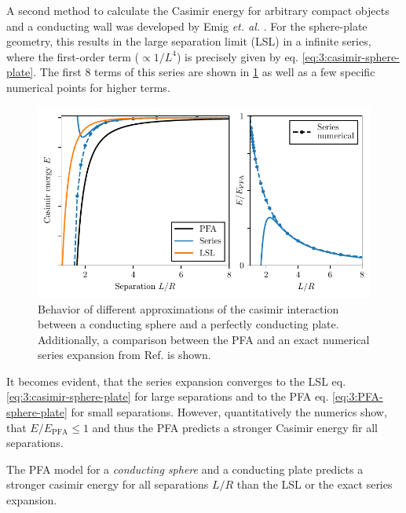 A second method to calculate the Casimir energy for arbitrary compact objects and a conducting wall was developed by Emig \textit{et. al.} \cite{Emig_2007}. For the sphere-plate geometry, this results in the large separation limit (LSL) in a infinite series, where the first-order term ($\propto 1/L^4$) is precisely given by eq. \eqref{eq:3:casimir-sphere-plate}. The first 8 terms of this series are shown in \cref{fig:3:casimir-behavior} as well as a few specific numerical points for higher terms.
\begin{figure}[!ht]
  \centering
  \includegraphics[width=\textwidth]{./../figures/casimir-behavior.pdf}
  \caption{Behavior of different approximations of the casimir interaction between a conducting sphere and a perfectly conducting plate. Additionally, a comparison between the PFA and an exact numerical series expansion from Ref. \cite{Emig_2007a} is shown.}
  \label{fig:3:casimir-behavior}
\end{figure}
It becomes evident, that the series expansion converges to the LSL eq. \eqref{eq:3:casimir-sphere-plate} for large separations and to the PFA eq. \eqref{eq:3:PFA-sphere-plate} for small separations.
However, quantitatively the numerics show, that $E/E_\mathrm{PFA} \leq 1$ and thus the PFA predicts a stronger Casimir energy fir all separations.
\begin{theorem}
  The PFA model for a \emph{conducting sphere} and a conducting plate predicts a stronger casimir energy for all separations $L/R$ than the LSL or the exact series expansion.
\end{theorem}
